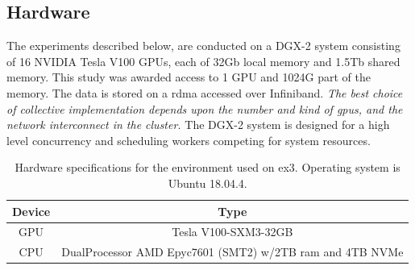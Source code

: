 \subsection{Hardware} \label{sec:hardware}
The experiments described below, are conducted on a 
DGX-2 system consisting of 16 NVIDIA Tesla V100 GPUs, each of 32Gb local memory and 1.5Tb shared memory. %
This study was awarded access to 1 GPU and 1024G part of the memory. The data is stored on a \acrfull{rdma} accessed over Infiniband. \textit{The best choice of collective implementation depends upon the number and kind of \acrshort{gpu}s, and the network interconnect in the cluster.} The DGX-2 system is designed for a high level concurrency and scheduling workers competing for system resources.
\begin{table}[ht]
    \centering
    \begin{tabular}{c|c}
        Device &  Type  \\ \hline
        GPU & Tesla V100-SXM3-32GB \\
        CPU & DualProcessor AMD Epyc7601 (SMT2) w/2TB ram and 4TB NVMe 
    \end{tabular}
    \caption{Hardware specifications for the environment used on \acrshort{ex3}. Operating system is Ubuntu 18.04.4.}
    \label{tab:hardware_ex3}
\end{table}
